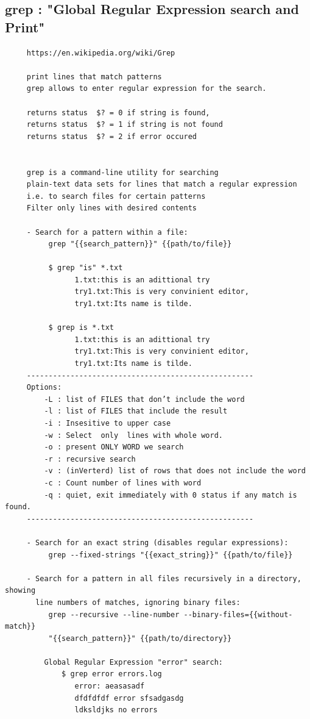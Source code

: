 \documentclass[a4paper,12pt]{article}
\begin{document}
\subsection{grep     : "Global Regular Expression search and Print" }
\begin{verbatim}
     https://en.wikipedia.org/wiki/Grep
     
     print lines that match patterns
     grep allows to enter regular expression for the search.
     
     returns status  $? = 0 if string is found,
     returns status  $? = 1 if string is not found
     returns status  $? = 2 if error occured
     
     
     grep is a command-line utility for searching 
     plain-text data sets for lines that match a regular expression
     i.e. to search files for certain patterns
     Filter only lines with desired contents

     - Search for a pattern within a file:
          grep "{{search_pattern}}" {{path/to/file}}
          
          $ grep "is" *.txt
				1.txt:this is an adittional try
				try1.txt:This is very convinient editor, 
				try1.txt:Its name is tilde.    

          $ grep is *.txt
				1.txt:this is an adittional try
				try1.txt:This is very convinient editor, 
				try1.txt:Its name is tilde. 
     ----------------------------------------------------
     Options:
         -L : list of FILES that don’t include the word
         -l : list of FILES that include the result
         ﻿-i : Insesitive to upper case     
         -w : Select  only  lines with whole word.
         -o : present ONLY WORD we search
         -r : recursive search
         -v : (inVerterd) list of rows that does not include the word
         -c : Count number of lines with word
         -q : quiet, exit immediately with 0 status if any match is found.
     ----------------------------------------------------
     
     - Search for an exact string (disables regular expressions):
          grep --fixed-strings "{{exact_string}}" {{path/to/file}}

     - Search for a pattern in all files recursively in a directory, showing   
       line numbers of matches, ignoring binary files:
          grep --recursive --line-number --binary-files={{without-match}}   
          "{{search_pattern}}" {{path/to/directory}}
         
         Global Regular Expression "error" search:
             $ grep error errors.log
                error: aeasasadf
                dfdfdfdf error sfsadgasdg
                ldksldjks no errors


\end{verbatim}
\end{document}
